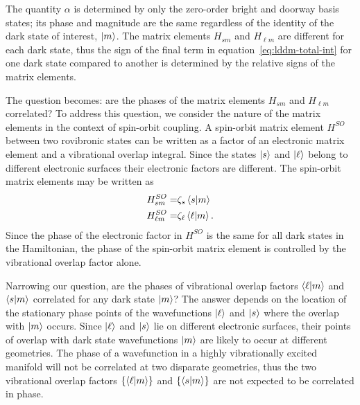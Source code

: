 The quantity $\alpha$ is determined by only the zero-order bright and
doorway basis states; its phase and magnitude are the same
regardless of the identity of the dark state of interest, $\mathinner{|{m}\rangle}$.
The matrix elements $H_{s m}$ and $H_{\ell m}$ are different for
each dark state, thus the sign of the final term in
equation~\ref{eq:lddm-total-int} for one dark state compared to
another is determined by the relative signs of the matrix elements.

The question becomes: are the phases of the matrix elements $H_{s m}$
and $H_{\ell m}$ correlated?  To address this question, we consider
the nature of the matrix elements in the context of spin-orbit
coupling.  A spin-orbit matrix element $H^{SO}$ between two rovibronic
states can be written as a factor of an electronic matrix element and
a vibrational overlap integral.  Since the states $\mathinner{|{s}\rangle}$ and
$\mathinner{|{\ell}\rangle}$ belong to different electronic surfaces their electronic
factors are different.  The spin-orbit matrix elements may be written
as
\begin{subequations}
  \label{eq:spinorbit-factors}
  \begin{align}
    H_{s m}^{SO} =& \zeta_s \mathinner{\langle{s|m}\rangle}\\
    H_{\ell m}^{SO} =& \zeta_\ell \mathinner{\langle{\ell|m}\rangle}.
  \end{align}
\end{subequations}
Since the phase of the electronic factor in $H^{SO}$ is the same for
all dark states in the Hamiltonian, the phase of the spin-orbit matrix
element is controlled by the vibrational overlap factor alone.

Narrowing our question, are the phases of vibrational overlap factors
$\mathinner{\langle{\ell|m}\rangle}$ and $\mathinner{\langle{s|m}\rangle}$ correlated for any dark state
$\mathinner{|{m}\rangle}$?  The answer depends on the location of the stationary phase
points of the wavefunctions $\mathinner{|{\ell}\rangle}$ and $\mathinner{|{s}\rangle}$ where the
overlap with $\mathinner{|{m}\rangle}$ occurs.  Since $\mathinner{|{\ell}\rangle}$ and $\mathinner{|{s}\rangle}$ lie
on different electronic surfaces, their points of overlap with dark
state wavefunctions $\mathinner{|{m}\rangle}$ are likely to occur at different
geometries.  The phase of a wavefunction in a highly vibrationally
excited manifold will not be correlated at two disparate geometries,
thus the two vibrational overlap factors $\lbrace \mathinner{\langle{\ell|m}\rangle}
\rbrace$ and $\lbrace \mathinner{\langle{s|m}\rangle} \rbrace$ are not expected to be
correlated in phase.

